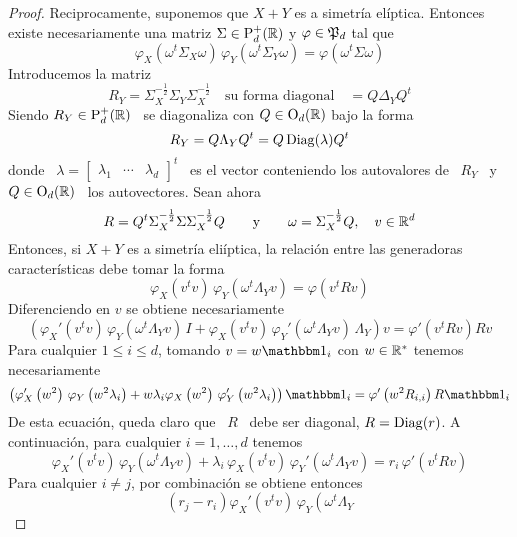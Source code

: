 \begin{proof}
  Reciprocamente,  suponemos que  $X+Y$  es a  simetr\'ia el\'iptica.   Entonces
  existe necesariamente  una matriz $\Sigma \in \mathrm{P}_d^+(\mathbb{R})$  y $\varphi \in
  \mathfrak{P}_d$ tal que
  \[
  \varphi_X\left(  \omega^t \Sigma_X  \omega\right) \,  \varphi_Y\left( \omega^t
    \Sigma_Y \omega\right) = \varphi\left( \omega^t \Sigma \omega\right)
  \]
  Introducemos la matriz
  \[
  R_Y  = \Sigma_X^{-\frac12} \Sigma_Y  \Sigma_X^{-\frac12} \quad  \mbox{su forma
    diagonal} \quad = Q \Delta_Y Q^t
  \]
  Siendo $R_Y  \in \mathrm{P}_d^+(\mathbb{R})$ \  se diagonaliza con $Q  \in \mathrm{O}_d(\mathbb{R})$
  bajo la forma~\cite{Bha97, Bha07, HorJoh13}
  \[
  R_Y = Q \Lambda_Y Q^t = Q \operatorname{Diag}(\lambda) Q^t
  \]
  donde    \    $\lambda    =    \begin{bmatrix}   \lambda_1    &    \cdots    &
    \lambda_d \end{bmatrix}^t$ \  es el vector conteniendo los  autovalores de \
  $R_Y$ \ y \ $Q \in \mathrm{O}_d(\mathbb{R})$ \ los autovectores. Sean ahora
  \[
  R  =  Q^t \Sigma_X^{-\frac12}  \Sigma  \Sigma_X^{-\frac12}  Q \qquad  \mbox{y}
  \qquad \omega = \Sigma_X^{-\frac12} Q, \quad v \in \mathbb{R}^d
  \]
  Entonces,  si $X+Y$  es  a  simetr\'ia eli\'iptica,  la  relaci\'on entre  las
  generadoras caracter\'isticas debe tomar la forma
  \[
  \varphi_X\left( v^t v \right)  \, \varphi_Y\left( \omega^t \Lambda_Y v \right)
  = \varphi\left( v^t R v \right)
  \]
  Diferenciendo en $v$ se obtiene necesariamente
  \[
  \left( \varphi_X'\left( v^t v  \right) \, \varphi_Y\left( \omega^t \Lambda_Y v
    \right) \,  I + \varphi_X\left(  v^t v \right) \,  \varphi_Y'\left( \omega^t
      \Lambda_Y  v \right)  \,  \Lambda_Y \right)  v  = \varphi'\left(  v^t R  v
  \right) R v
  \]
  Para cualquier  $1 \le i  \le d$, tomando  $v = w  \un_i$ con $w  \in \mathbb{R}^*$
  tenemos necesariamente
  \[
  \left( \varphi_X'\left( w^2 \right) \, \varphi_Y\left( w^2 \lambda_i \right) +
    w \lambda_i  \varphi_X\left( w^2  \right) \, \varphi_Y'\left(  w^2 \lambda_i
    \right) \right) \un_i = \varphi'\left( w^2 R_{i,i} \right) R \un_i
  \]
  De esta ecuaci\'on, queda claro que \ $R$ \ debe ser diagonal, $R = \operatorname{Diag}(r)$.
  A continuaci\'on, para cualquier $i = 1 , \ldots , d$ tenemos
  \[
  \varphi_X'\left( v^t v \right) \, \varphi_Y\left( \omega^t \Lambda_Y v \right)
  +  \lambda_i \,  \varphi_X\left( v^t  v \right)  \,  \varphi_Y'\left( \omega^t
    \Lambda_Y v \right) = r_i \, \varphi'\left( v^t R v \right)
  \]
  Para cualquier $i \ne j$, por combinaci\'on se obtiene entonces
  \[
  (r_j-r_i) \varphi_X'\left( v^t v \right) \, \varphi_Y\left( \omega^t \Lambda_Y
\]
\end{proof}
